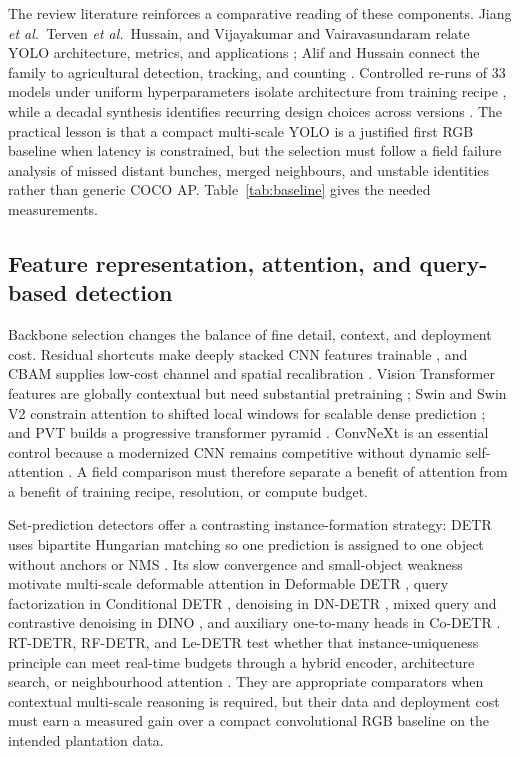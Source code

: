 The review literature reinforces a comparative reading of these components. Jiang \textit{et al.}\, Terven \textit{et al.}\, Hussain, and Vijayakumar and Vairavasundaram relate YOLO architecture, metrics, and applications \cite{jiang2022yoloreview,terven2023yolo,hussain2023yolo,vijayakumar2024yolo}; Alif and Hussain connect the family to agricultural detection, tracking, and counting \cite{sapkota2024yoloagri}. Controlled re-runs of 33 models under uniform hyperparameters isolate architecture from training recipe \cite{alif2024yoloevolution}, while a decadal synthesis identifies recurring design choices across versions \cite{sapkota2025yologenesis}. The practical lesson is that a compact multi-scale YOLO is a justified first RGB baseline when latency is constrained, but the selection must follow a field failure analysis of missed distant bunches, merged neighbours, and unstable identities rather than generic COCO AP. Table~\ref{tab:baseline} gives the needed measurements.

\subsection{Feature representation, attention, and query-based detection}

Backbone selection changes the balance of fine detail, context, and deployment cost. Residual shortcuts make deeply stacked CNN features trainable \cite{he2016resnet}, and CBAM supplies low-cost channel and spatial recalibration \cite{woo2018cbam}. Vision Transformer features are globally contextual but need substantial pretraining \cite{dosovitskiy2021vit}; Swin and Swin V2 constrain attention to shifted local windows for scalable dense prediction \cite{liu2021swin,liu2022swinv2}; and PVT builds a progressive transformer pyramid \cite{wang2021pvt}. ConvNeXt is an essential control because a modernized CNN remains competitive without dynamic self-attention \cite{liu2022convnext}. A field comparison must therefore separate a benefit of attention from a benefit of training recipe, resolution, or compute budget.

Set-prediction detectors offer a contrasting instance-formation strategy: DETR uses bipartite Hungarian matching so one prediction is assigned to one object without anchors or NMS \cite{carion2020detr}. Its slow convergence and small-object weakness motivate multi-scale deformable attention in Deformable DETR \cite{zhu2021deformabledetr}, query factorization in Conditional DETR \cite{meng2021conditionaldetr}, denoising in DN-DETR \cite{li2022dndetr}, mixed query and contrastive denoising in DINO \cite{zhang2023dino}, and auxiliary one-to-many heads in Co-DETR \cite{zong2023codetr}. RT-DETR, RF-DETR, and Le-DETR test whether that instance-uniqueness principle can meet real-time budgets through a hybrid encoder, architecture search, or neighbourhood attention \cite{zhao2024rtdetr,robinson2025rfdetr,huang2026ledetr}. They are appropriate comparators when contextual multi-scale reasoning is required, but their data and deployment cost must earn a measured gain over a compact convolutional RGB baseline on the intended plantation data.

